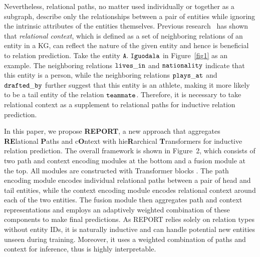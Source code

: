 \documentclass{article}
\begin{document}
Nevertheless, relational paths, no matter used individually or together as a subgraph, describe only the relationships between a pair of entities while ignoring the intrinsic attributes of the entities themselves. 
Previous research~\cite{gake,pathcon} has shown that \textit{relational context}, which is defined as a set of neighboring relations of an entity in a KG, can reflect the nature of the given entity and hence is beneficial to relation prediction. Take the entity ${\small\tt A.\ Iguodala}$ in Figure~\ref{fig1} as an example. The neighboring relations ${\small\tt lives\_in}$ and ${\small\tt nationality}$ indicate that this entity is a person, while the neighboring relations ${\small\tt plays\_at}$ and ${\small\tt drafted\_by}$ further suggest that this entity is an athlete, making it more likely to be a tail entity of the relation ${\small\tt teammate}$. Therefore, it is necessary to take relational context as a supplement to relational paths for inductive relation prediction.



In this paper, we propose \textbf{REPORT}, a new approach that aggregates \textbf{RE}lational \textbf{P}aths and c\textbf{O}ntext with hie\textbf{R}archical \textbf{T}ransformers for inductive relation prediction. The overall framework is shown in Figure~2, which consists of two path and context encoding modules at the bottom and a fusion module at the top.
All modules are constructed with Transformer blocks \cite{DBLP:conf/nips/VaswaniSPUJGKP17}.
The path encoding module encodes individual relational paths between a pair of head and tail entities, while the context encoding module encodes relational context around each of the two entities. The fusion module then aggregates path and context representations and employs an adaptively weighted combination of these components to make final predictions. 
As REPORT relies solely on relation types without entity IDs, it is naturally inductive and can handle potential new entities unseen during training. 
Moreover, it uses a weighted combination of paths and context for inference, thus is highly interpretable.
\end{document}
